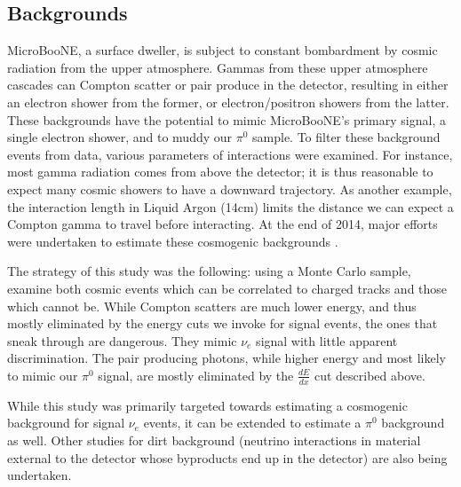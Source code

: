 \documentclass[12pt]{article}
\begin{document}
\subsection{Backgrounds}

 MicroBooNE, a surface dweller, is subject to constant bombardment by cosmic radiation from the upper atmosphere. Gammas from these upper atmosphere cascades can Compton scatter or pair produce in the detector, resulting in either an electron shower from the former, or electron/positron showers from the latter. These backgrounds have the potential to mimic MicroBooNE's primary signal, a single electron shower, and to muddy our $\pi^0$ sample.  To filter these background events from data, various parameters of interactions were examined. For instance, most gamma radiation comes from above the detector; it is thus reasonable to expect many cosmic showers to have a downward trajectory. As another example, the interaction length in Liquid Argon (14cm) limits the distance we can expect a Compton gamma to travel before interacting. At the end of 2014, major efforts were undertaken to estimate these cosmogenic backgrounds \cite{technote}.   
\par The strategy of this study was the following: using a Monte Carlo sample, examine both cosmic events which can be correlated to charged tracks and those which cannot be. While Compton scatters are much lower energy, and thus mostly eliminated by the energy cuts we invoke for signal events, the ones that sneak through are dangerous. They mimic $\nu_e$ signal with little apparent discrimination.  The pair producing photons, while higher energy and most likely to mimic our $\pi^0$ signal, are mostly eliminated by the $\frac{dE}{dx}$ cut described above. 
\par While this study was primarily targeted towards estimating a cosmogenic background for signal $\nu_e$ events, it can be extended to estimate a $\pi^0$ background as well. Other studies for dirt background (neutrino interactions in material external to the detector whose byproducts end up in the detector) are also being undertaken.  
\end{document}
